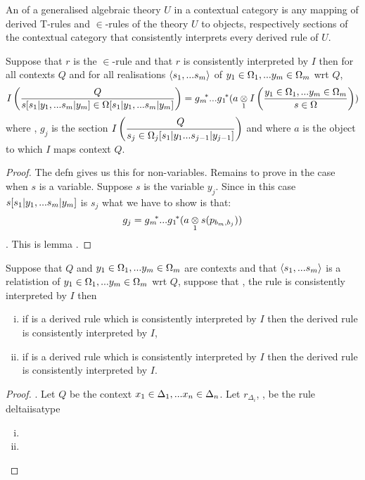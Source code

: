 \begin{definition}
An  of a generalised algebraic theory $U$ in a contextual category \catcw is  any mapping 
of derived T-rules and $\in$-rules of the theory $U$ to objects, respectively sections of the contextual category \catcw that
consistently interprets every derived rule of $U$.
\end{definition}

\begin{lemma}
Suppose that $r$ is the $\in$-rule \ZsOmega and that
$r$ is consistently interpreted by $I$ 
then
for all contexts $Q$ and for all realisations $\tuple{\sm}$ of $\yOmega{m}$ wrt $Q$, 
$$ \Imappedrule{Q}{\ofT{s[\SUBsmFORym]}{\Omega[\SUBsmFORym]}} = \gmstar...\gonestar(\crossx{a}{\Imappedrule{\yOmega{m}}{\ofT{s}{\Omega}}}{1})$$
where \foreachj, $g_j$ is the section
$\displaystyle\Imappedrule{Q}{ \ofT{s_j}{\Omega_j [s_1|y_1...s_{j-1}|y_{j-1}]}}$
and where $a$ is the object to which $I$ maps context $Q$.
\end{lemma}
\begin{proof}
The defn gives us this for non-variables. Remains to prove in the case when $s$ is a variable. Suppose $s$ is the variable
$y_j$. Since in this case $s[\SUBsmFORym]$ is $s_j$ what we have to show is that:
$$g_j = \gmvectorstar(\crossx{a}{s(p_{b_m,b_j}}{1}))$$. This is lemma .
\end{proof}

\begin{lemma}
Suppose that $Q$ and $\yOmega{m}$ are contexts and that $\tuple{\sm}$ is a relatistion of $\yOmega{m}$ wrt $Q$,
suppose that \foreachj, the rule
 is consistently interpreted by $I$ then
\begin{enumerate}[(i)]
\item if \ZOmega is a derived rule which is consistently interpreted by $I$
then the derived rule 
\ZOmegaSUBsmFORym is consistently interpreted by $I$,
\item if \ZsOmega is a derived rule which is consistently interpreted by $I$
then the derived rule 
\ZsOmegaSUBsmFORym is consistently interpreted by $I$.
\end{enumerate}
\end{lemma}
\begin{proof}
.
Let $Q$ be the context $\xDelta{n}$. Let $r_{\Delta_i}$, \foreachi, be the rule deltaiisatype
\begin{enumerate}[(i)]
\item

\item
\end{enumerate}
\end{proof}

